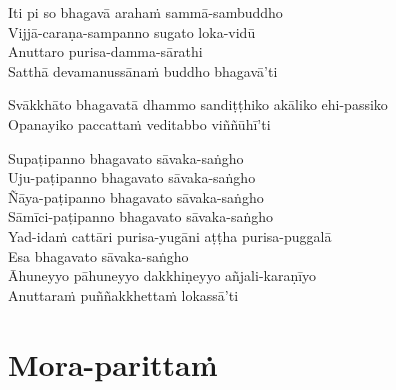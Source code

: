 \begin{paritta}
Iti pi so bhagavā arahaṁ sammā-sambuddho\\
Vijjā-caraṇa-sampanno sugato loka-vidū\\
Anuttaro purisa-damma-sārathi\\
Satthā devamanussānaṁ buddho bhagavā'ti

Svākkhāto bhagavatā dhammo sandiṭṭhiko akāliko ehi-passiko\\
Opanayiko paccattaṁ veditabbo viññūhī'ti

Supaṭipanno bhagavato sāvaka-saṅgho\\
Uju-paṭipanno bhagavato sāvaka-saṅgho\\
Ñāya-paṭipanno bhagavato sāvaka-saṅgho\\
Sāmīci-paṭipanno bhagavato sāvaka-saṅgho\\
Yad-idaṁ cattāri purisa-yugāni aṭṭha purisa-puggalā\\
Esa bhagavato sāvaka-saṅgho\\
Āhuneyyo pāhuneyyo dakkhiṇeyyo añjali-karaṇīyo\\
Anuttaraṁ puññakkhettaṁ lokassā'ti
\end{paritta}

\clearpage

\chapter{Mora-parittaṁ}


